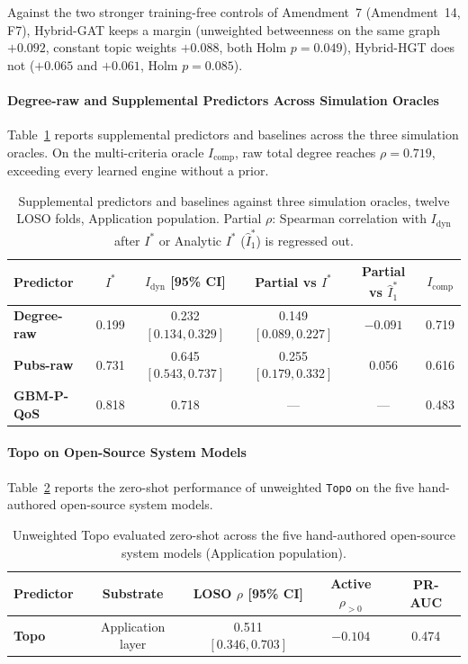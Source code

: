 \documentclass[preprint,3p]{elsarticle}
\begin{document}
Against the two stronger training-free controls of Amendment~7 (Amendment~14, F7), Hybrid-GAT keeps a margin (unweighted betweenness on the same graph $+0.092$, constant topic weights $+0.088$, both Holm $p = 0.049$), Hybrid-HGT does not ($+0.065$ and $+0.061$, Holm $p = 0.085$).

\paragraph{Degree-raw and Supplemental Predictors Across Simulation Oracles}
Table~\ref{tab:supp-moved-oracles} reports supplemental predictors and baselines across the three simulation oracles. On the multi-criteria oracle $I_{\text{comp}}$, raw total degree reaches $\rho = 0.719$, exceeding every learned engine without a prior.

\begin{table}[htbp]
\centering
\small
\caption{Supplemental predictors and baselines against three simulation oracles, twelve LOSO folds, Application population. Partial $\rho$: Spearman correlation with $I_{\text{dyn}}$ after $I^*$ or Analytic $I^*$ ($\hat{I}^*_1$) is regressed out.}
\label{tab:supp-moved-oracles}
\begin{tabular}{lccccc}
\toprule
\textbf{Predictor} & \textbf{$I^*$} & \textbf{$I_{\text{dyn}}$ [95\% CI]} & \textbf{Partial vs $I^*$} & \textbf{Partial vs $\hat{I}^*_1$} & \textbf{$I_{\text{comp}}$} \\
\midrule
\textbf{Degree-raw} & 0.199 & 0.232 $[0.134, 0.329]$ & 0.149 $[0.089, 0.227]$ & $-0.091$ & 0.719 \\
\textbf{Pubs-raw} & 0.731 & 0.645 $[0.543, 0.737]$ & 0.255 $[0.179, 0.332]$ & 0.056 & 0.616 \\
\textbf{GBM-P-QoS} & 0.818 & 0.718 & --- & --- & 0.483 \\
\bottomrule
\end{tabular}
\end{table}

\paragraph{Topo on Open-Source System Models}
Table~\ref{tab:supp-moved-systems} reports the zero-shot performance of unweighted \texttt{Topo} on the five hand-authored open-source system models.

\begin{table}[htbp]
\centering
\small
\caption{Unweighted Topo evaluated zero-shot across the five hand-authored open-source system models (Application population).}
\label{tab:supp-moved-systems}
\begin{tabular}{lcccc}
\toprule
\textbf{Predictor} & \textbf{Substrate} & \textbf{LOSO $\rho$ [95\% CI]} & \textbf{Active $\rho_{>0}$} & \textbf{PR-AUC} \\
\midrule
\textbf{Topo} & Application layer & 0.511 $[0.346, 0.703]$ & $-0.104$ & 0.474 \\
\bottomrule
\end{tabular}
\end{table}
\end{document}
